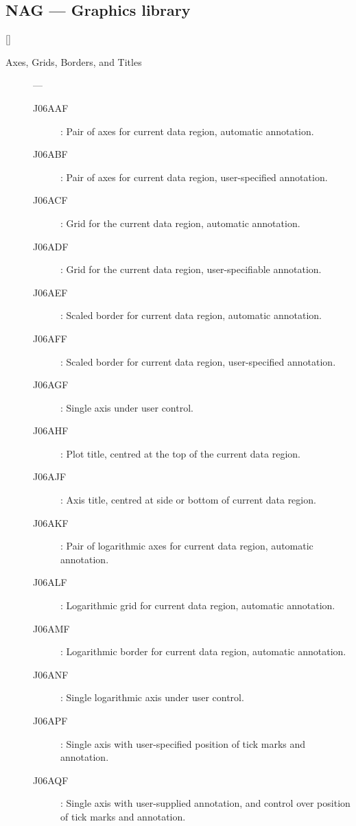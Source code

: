 \newpage

\subsection{NAG --- Graphics library} 

\vspace{-9mm}

\hfill []

\vspace{2mm}

\begin{description}

\item [Axes, Grids, Borders, and Titles] ---

\begin{description}
\item [J06AAF] : Pair of axes for current data region, automatic annotation.
\item [J06ABF] : Pair of axes for current data region, user-specified annotation.
\item [J06ACF] : Grid for the current data region, automatic annotation.
\item [J06ADF] : Grid for the current data region, user-specifiable annotation.
\item [J06AEF] : Scaled border for current data region, automatic annotation.
\item [J06AFF] : Scaled border for current data region, user-specified annotation.
\item [J06AGF] : Single axis under user control.
\item [J06AHF] : Plot title, centred at the top of the current data region.
\item [J06AJF] : Axis title, centred at side or bottom of current data region.
\item [J06AKF] : Pair of logarithmic axes for current data region, automatic annotation.
\item [J06ALF] : Logarithmic grid for current data region, automatic annotation.
\item [J06AMF] : Logarithmic border for current data region, automatic annotation.
\item [J06ANF] : Single logarithmic axis under user control.
\item [J06APF] : Single axis with user-specified position of tick marks and annotation.
\item [J06AQF] : Single axis with user-supplied annotation, and control over position of tick marks and annotation.
\end{description}


\end{description}
